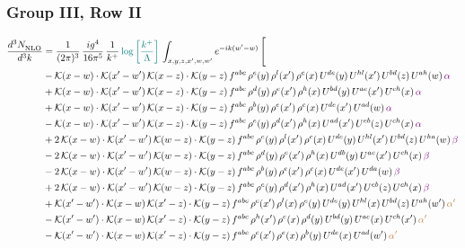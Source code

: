 \documentclass[9pt]{article}
\numberwithin{equation}{section}
\begin{document}
\subsubsection{Group III, Row II}
\begin{align}
     \frac{d^{3}N_{\rm NLO}^{\rm}}{d^{3}k}  & = \frac{1}{(2\pi)^{3}}\, \frac{ig^{4}}{16\pi^{5}}\, \frac{1}{k^{+}}\, {\color{teal}\log{\left[\frac{k^{+}}{\Lambda}\right]}}\,\int_{x,y,z,x^{\prime},w,w^{\prime}}e^{-ik(w^{\prime}-w)}\, \Bigg[\notag \\ & -\mathcal{K}(x-w)\cdot \mathcal{K}(x'-w')\, \mathcal{K}(x-z)\cdot \mathcal{K}(y-z)\, f^{abc}\, \rho^{e}(y)\,\rho^{l}(x')\,\rho^{c}(x)\,U^{de}(y)\,U^{hl}(x')\,U^{bd}(z)\,U^{ah}(w)\, {\color{violet}\alpha} \notag \\ & +\mathcal{K}(x-w)\cdot \mathcal{K}(x'-w')\, \mathcal{K}(x-z)\cdot \mathcal{K}(y-z)\, f^{abc}\, \rho^{d}(y)\,\rho^{e}(x')\,\rho^{h}(x)\,U^{bd}(y)\,U^{ae}(x')\,U^{ch}(x)\, {\color{violet}\alpha} \notag \\ & + \mathcal{K}(x-w)\cdot \mathcal{K}(x'-w')\, \mathcal{K}(x-z)\cdot \mathcal{K}(y-z)\, f^{abc}\, \rho^{b}(y)\,\rho^{e}(x')\,\rho^{c}(x)\,U^{de}(x')\,U^{ad}(w)\, {\color{violet}\alpha} \notag \\ & -\mathcal{K}(x-w)\cdot \mathcal{K}(x'-w')\, \mathcal{K}(x-z)\cdot \mathcal{K}(y-z)\, f^{abc}\, \rho^{e}(y)\,\rho^{d}(x')\,\rho^{h}(x)\,U^{ad}(x')\,U^{eb}(z)\,U^{ch}(x)\, {\color{violet}\alpha} \notag \\ & +2\, \mathcal{K}(x-w)\cdot \mathcal{K}(x'-w')\, \mathcal{K}(w-z) \cdot \mathcal{K}(y-z)\, f^{abc}\, \rho^{e}(y)\,\rho^{l}(x')\, \rho^{c}(x)\, U^{de}(y)\,U^{hl}(x')\,U^{bd}(z)\,U^{ha}(w)\, {\color{violet} \beta} \notag \\ & -2\, \mathcal{K}(x-w)\cdot \mathcal{K}(x'-w')\, \mathcal{K}(w-z) \cdot \mathcal{K}(y-z)\, f^{abc}\, \rho^{d}(y)\,\rho^{e}(x')\, \rho^{h}(x)\, U^{db}(y)\,U^{ae}(x')\,U^{ch}(x)\, {\color{violet} \beta}\notag \\ & -2\, \mathcal{K}(x-w)\cdot \mathcal{K}(x'-w')\, \mathcal{K}(w-z) \cdot \mathcal{K}(y-z)\, f^{abc}\, \rho^{b}(y)\,\rho^{e}(x')\, \rho^{c}(x)\, U^{de}(x')\,U^{da}(w)\, {\color{violet} \beta}\notag \\ & + 2\, \mathcal{K}(x-w)\cdot \mathcal{K}(x'-w')\, \mathcal{K}(w-z) \cdot \mathcal{K}(y-z)\, f^{abc}\, \rho^{e}(y)\,\rho^{d}(x')\, \rho^{h}(x)\, U^{ad}(x')\,U^{eb}(z)\,U^{ch}(x)\, {\color{violet} \beta}\notag \\ & +\mathcal{K}(x'-w')\cdot\mathcal{K}(x-w)\,\mathcal{K}(x'-z)\cdot\mathcal{K}(y-z)\, f^{abc}\,\rho^{c}(x')\,\rho^{l}(x)\,\rho^{e}(y)\,U^{de}(y)\,U^{hl}(x)\,U^{bd}(z)\,U^{ah}(w')\,{\color{brown} \alpha'}\notag\\ & -\mathcal{K}(x'-w')\cdot\mathcal{K}(x-w)\,\mathcal{K}(x'-z)\cdot\mathcal{K}(y-z)\, f^{abc}\,\rho^{h}(x')\,\rho^{e}(x)\,\rho^{d}(y)\,U^{bd}(y)\,U^{ae}(x)\,U^{ch}(x')\,{\color{brown} \alpha'}\notag\\ &-\mathcal{K}(x'-w')\cdot\mathcal{K}(x-w)\,\mathcal{K}(x'-z)\cdot\mathcal{K}(y-z)\, f^{abc}\,\rho^{c}(x')\,\rho^{e}(x)\,\rho^{b}(y)\,U^{de}(x)\,U^{ad}(w')\,{\color{brown} \alpha'}\notag\\ & 
\end{align}
\end{document}
